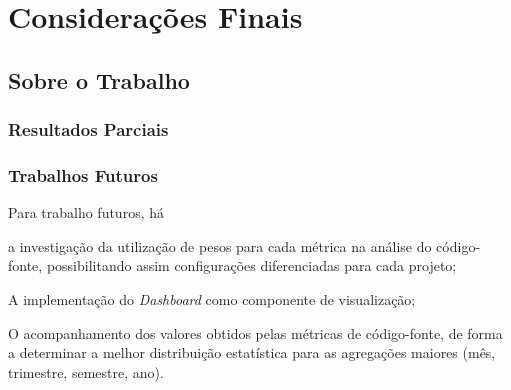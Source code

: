 \chapter{Considerações Finais}


\section{Sobre o Trabalho}

\subsection{Resultados Parciais}

\subsection{Trabalhos Futuros}

Para trabalho futuros, há\begin{inparaenum}[i)] \item a investigação da utilização de pesos para cada métrica na análise do código-fonte, possibilitando assim configurações diferenciadas para cada projeto; \item A implementação do \textit{Dashboard} como componente de visualização; \item O acompanhamento dos valores obtidos pelas métricas de código-fonte, de forma a determinar a melhor distribuição estatística para as agregações maiores (mês, trimestre, semestre, ano).
\end{inparaenum}






